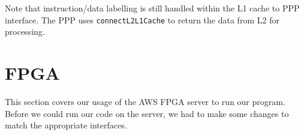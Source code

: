 \documentclass{article}
\begin{document}
Note that instruction/data labelling is still handled within the L1 cache to PPP interface. The PPP uses \lstinline{connectL2L1Cache} to return the data from L2 for processing.









\section{FPGA}

This section covers our usage of the AWS FPGA server to run our program. Before we could run our code on the server, we had to make some changes to match the appropriate interfaces.
\end{document}
